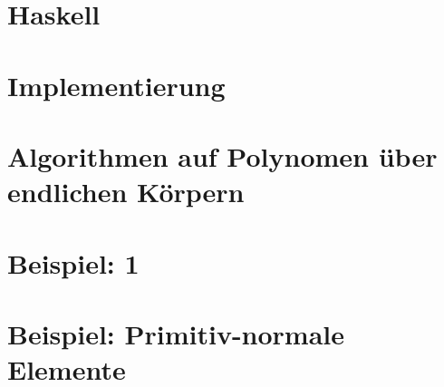 \documentclass[ngerman
  ,fontsize=11pt %
  ,numbers=noenddot %
  ,parskip=half*
  ,openany
  ,DIV=10
  ,fleqn %
  ,oneside
  ,DIV=10
]{./myClass}
\begin{document}
\ifnum{}
  \frontmatter
  
  \newpage \thispagestyle{empty} \mbox{}
\else
  \mainmatter
\fi

\tableofcontents{}


\ifnum{}
  \mainmatter
\fi

%

\chapter{Haskell}


\chapter{Implementierung}








\chapter{Algorithmen auf Polynomen über endlichen Körpern}
\label{chap:algs}





\chapter{Beispiel: 1}
%
\chapter{Beispiel: Primitiv-normale Elemente}
\label{chap:bsp-prim-norm}



%

\pagebreak
\printbibliography

\appendix
{}



\end{document}

